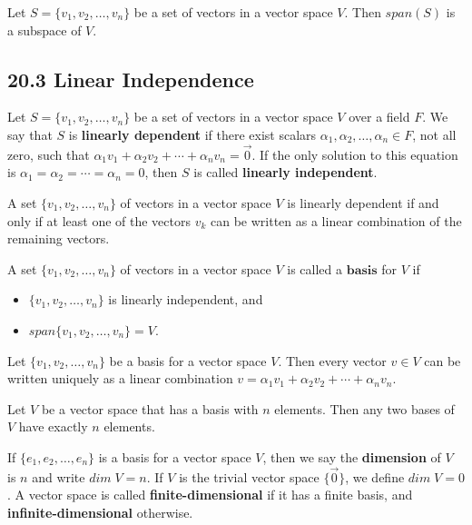 \documentclass{article}
\begin{document}
\begin{theorem}
  Let $S=\{v_1,v_2,\dots,v_n\}$ be a set of vectors in a vector space $V$. Then $span(S)$ is a subspace of $V$.
\end{theorem}

\subsection{20.3 Linear Independence}
\begin{definition}
  Let $S=\{v_1,v_2,\dots,v_n\}$ be a set of vectors in a vector space $V$ over a field $F$. We say that $S$ is \textbf{linearly dependent} if there exist scalars $\alpha_1,\alpha_2,\dots,\alpha_n\in F$, not all zero, such that $\alpha_1v_1+\alpha_2v_2+\cdots+\alpha_nv_n=\vec{0}$. If the only solution to this equation is $\alpha_1=\alpha_2=\cdots=\alpha_n=0$, then $S$ is called \textbf{linearly independent}.
\end{definition}

A set $\{v_1,v_2,\dots,v_n\}$ of vectors in a vector space $V$ is linearly dependent if and only if at least one of the vectors $v_k$ can be written as a linear combination of the remaining vectors.

\begin{definition}
  A set $\{v_1,v_2,\dots,v_n\}$ of vectors in a vector space $V$ is called a $\textbf{basis}$ for $V$ if
  \begin{itemize}
    \item $\{v_1,v_2,\dots,v_n\}$ is linearly independent, and
    \item $span\{v_1,v_2,\dots,v_n\}=V$.
  \end{itemize}
\end{definition}
\begin{theorem}
  Let $\{v_1,v_2,\dots,v_n\}$ be a basis for a vector space $V$. Then every vector $v\in V$ can be written uniquely as a linear combination $v=\alpha_1v_1+\alpha_2v_2+\cdots+\alpha_nv_n$.
\end{theorem}
\begin{theorem}
  Let $V$ be a vector space that has a basis with $n$ elements. Then any two bases of $V$ have exactly $n$ elements.
\end{theorem}
\begin{definition}
  If $\{e_1,e_2,\dots,e_n\}$ is a basis for a vector space $V$, then we say the \textbf{dimension} of $V$ is $n$ and write $dim\;V=n$. If $V$ is the trivial vector space $\{\vec{0}\}$, we define $dim\;V=0$. A vector space is called \textbf{finite-dimensional} if it has a finite basis, and \textbf{infinite-dimensional} otherwise.
\end{definition}
\end{document}
